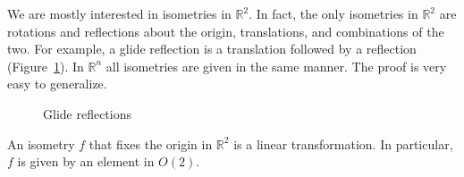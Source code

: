  
 
We are mostly interested in isometries in ${\mathbb R}^2$. In fact, the
only isometries in ${\mathbb R}^2$ are rotations and reflections  about
the origin, translations, and combinations of the two. For example, a
{\bfi glide reflection\/} is a translation
followed by a reflection (Figure~\ref{Glide}).   In ${\mathbb R}^n$ all
isometries are given in the same manner. The proof is very easy to
generalize. 
 
 
\begin{figure}[htb]

\begin{center}
\end{center}
\caption{Glide reflections}
\label{Glide}
\end{figure}
 
 
\begin{lemma}
An isometry $f$ that fixes the origin in ${\mathbb R}^2$ is a linear
transformation.  In particular, $f$ is given by an element in $O(2)$. 
\end{lemma}
 
